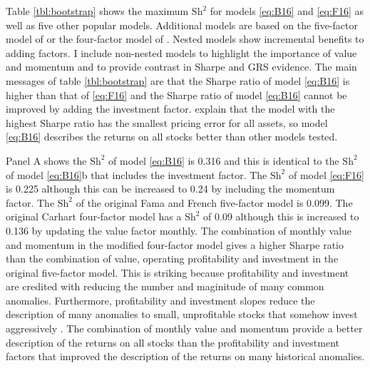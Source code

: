 

Table \ref{tbl:bootstrap} shows the maximum $\text{Sh}^2$ for models
\ref{eq:B16} and \ref{eq:F16} as well as five other popular models. Additional
models are based on the five-factor model of \textcite{fama2015five} or the
four-factor model of \textcite{carhart1997persistence}. Nested models show
incremental benefits to adding factors. I include non-nested models to
highlight the importance of value and momentum and to provide contrast in
Sharpe and GRS evidence.
The main messages of table \ref{tbl:bootstrap} are that the
Sharpe ratio of model \ref{eq:B16} is higher than that of \ref{eq:F16} and the
Sharpe ratio of model \ref{eq:B16} cannot be improved by adding the investment
factor. \textcite{barillas2016alpha} explain that the model with the highest
Sharpe ratio has the smallest pricing error for all assets, so model
\ref{eq:B16} describes the returns on all stocks better than other models
tested.

Panel A shows the $\text{Sh}^2$ of model \ref{eq:B16} is 0.316 and this
is identical to the $\text{Sh}^2$ of model \ref{eq:B16}b that includes
the investment factor. The $\text{Sh}^2$ of model \ref{eq:F16} is 0.225
although this can be increased to 0.24 by including the momentum factor. The
$\text{Sh}^2$ of the original Fama and French five-factor model is 0.099. The
original Carhart four-factor model has a $\text{Sh}^2$ of 0.09 although this is
increased to 0.136 by updating the value factor monthly. The combination of
monthly value and momentum in the modified four-factor model
gives a higher Sharpe ratio than the combination of
value, operating profitability and investment in the original five-factor
model.
This is striking because
profitability and investment are credited with reducing the number and
maginitude of many common anomalies. Furthermore, profitability and investment
slopes reduce the description of many anomalies to small, unprofitable stocks
that somehow invest aggressively \parencite{fama2015five, fama2016dissecting}.
The combination of monthly value
and momentum provide a better description of the
returns on all stocks than the profitability and investment factors that
improved the description of the returns on many historical anomalies.

